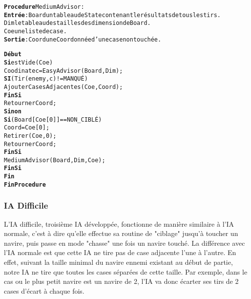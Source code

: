 \begin{alltt}
{\bf Procedure} MediumAdvisor :
    {\bf Entrée} : Board un tableau de State contenant le résultats de tous les tirs.
              Dim le tableau des tailles des dimension de Board.
              Coe une liste de case.
    {\bf Sortie} : Coord une Coordonnée d’une case non touchée.

    {\bf Début}
        {\bf Si} estVide(Coe) 
            Coodinate c = EasyAdvisor(Board, Dim) ;
            {\bf SI} (Tir(enemy, c) != MANQUÉ)
                AjouterCasesAdjacentes(Coe, Coord) ;
            {\bf FinSi}
            Retourner Coord ;
        {\bf Sinon} 
            {\bf Si} (Board[Coe[0]] == NON_CIBLÉ)
                Coord = Coe[0] ;
                Retirer(Coe, 0) ;
                Retourner Coord ;
            {\bf FinSi}
            MediumAdvisor(Board, Dim, Coe);
        {\bf FinSi}
    {\bf Fin}
{\bf Fin Procedure}            
\end{alltt}

\newpage

\subsubsection{IA Difficile}
    L'IA difficile, troisième IA développée, fonctionne de manière similaire à l'IA normale, c'est à dire qu'elle effectue sa routine de "ciblage" jusqu'à toucher un navire, puis passe en mode "chasse" une fois un navire touché.
    La différence avec l'IA normale est que cette IA ne tire pas de case adjacente l'une à l'autre. En effet, suivant la taille minimal du navire ennemi existant au début de partie, notre IA ne tire que toutes les cases séparées de cette taille.
    Par exemple, dans le cas ou le plus petit navire est un navire de 2, l'IA va donc écarter ses tirs de 2 cases d'écart à chaque fois.
    

